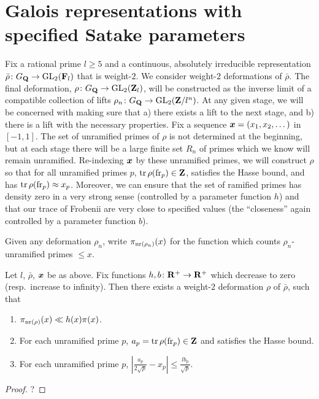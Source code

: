 \section{Galois representations with specified Satake parameters}

Fix a rational prime $l\geqslant 5$ and a continuous, absolutely irreducible 
representation $\bar\rho\colon G_{\mathbf{Q}} \to \operatorname{GL}_2(\mathbf{F}_l)$ that is weight-$2$. We 
consider weight-$2$ deformations of $\bar\rho$. The final deformation, 
$\rho\colon G_{\mathbf{Q}} \to \operatorname{GL}_2(\mathbf{Z}_l)$, will be constructed as the inverse limit 
of a compatible collection of lifts $\rho_n\colon G_{\mathbf{Q}} \to \operatorname{GL}_2(\mathbf{Z}/l^n)$. At 
any given stage, we will be concerned with making sure that a) there exists a 
lift to the next stage, and b) there is a lift with the necessary properties. 
Fix a sequence ${\boldsymbol x}=(x_1,x_2,\dots)$ in $[-1,1]$. The set of unramified primes 
of $\rho$ is not determined at the beginning, but at each stage there will be 
a large finite set $R_n$ of primes which we know will remain unramified. 
Re-indexing ${\boldsymbol x}$ by these unramified primes, we will construct $\rho$ so that 
for all unramified primes $p$, $\operatorname{tr}\rho(\mathrm{fr}_p)\in \mathbf{Z}$, satisfies the Hasse 
bound, and has $\operatorname{tr}\rho(\mathrm{fr}_p) \approx x_p$. Moreover, we can ensure that the 
set of ramified primes has density zero in a very strong sense (controlled by a 
parameter function $h$) and that our trace of Frobenii are very close to 
specified values (the ``closeness'' again controlled by a parameter function 
$b$). 

Given any deformation $\rho_n$, write $\pi_{\mathrm{nr}(\rho_n)}(x)$ for the function 
which counts $\rho_n$-unramified primes $\leqslant x$. 

\begin{theorem}\label{thm:master-Galois}
Let $l$, $\bar\rho$, ${\boldsymbol x}$ be as above. Fix functions 
$h,b\colon \mathbf{R}^+\to \mathbf{R}^+$ which decrease to zero (resp.~increase to infinity). 
Then there exists a weight-$2$ deformation $\rho$ of $\bar\rho$, such that 
\begin{enumerate}
\item
$\pi_{\mathrm{nr}(\rho)}(x) \ll h(x) \pi(x)$. 

\item
For each unramified prime $p$, $a_p=\operatorname{tr}\rho(\mathrm{fr}_p)\in \mathbf{Z}$ and satisfies the 
Hasse bound. 

\item
For each unramified prime $p$, 
$\left| \frac{a_p}{2\sqrt p} - x_p\right| \leqslant \frac{l b_p}{\sqrt p}$. 
\end{enumerate}
\end{theorem}
\begin{proof}
?
\end{proof}


